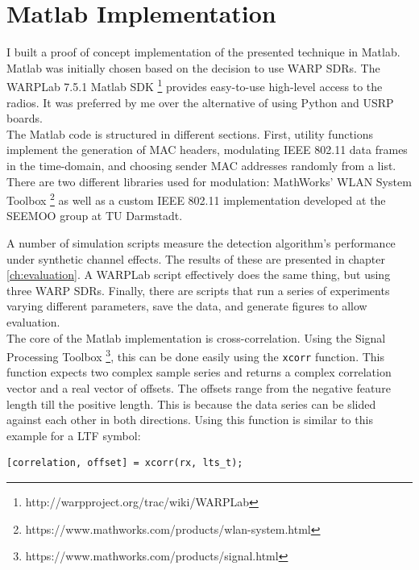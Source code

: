 
\section{Matlab Implementation}\label{sec:matlab-impl}

I built a proof of concept implementation of the presented technique in Matlab. Matlab was initially chosen based on the decision to use \gls{WARP} \glspl{SDR}. The WARPLab 7.5.1 Matlab \gls{SDK} \footnote{http://warpproject.org/trac/wiki/WARPLab} provides easy-to-use high-level access to the radios. It was preferred by me over the alternative of using Python and \gls{USRP} boards.\\

The Matlab code is structured in different sections. First, utility functions implement the generation of \gls{MAC} headers, modulating IEEE 802.11 data frames in the time-domain, and choosing sender \gls{MAC} addresses randomly from a list. There are two different libraries used for modulation: MathWorks' WLAN System Toolbox \footnote{https://www.mathworks.com/products/wlan-system.html} as well as a custom IEEE 802.11 implementation developed at the \gls{SEEMOO} group at TU Darmstadt.

A number of simulation scripts measure the detection algorithm's performance under synthetic channel effects. The results of these are presented in chapter \ref{ch:evaluation}. A WARPLab script effectively does the same thing, but using three \gls{WARP} \glspl{SDR}. Finally, there are scripts that run a series of experiments varying different parameters, save the data, and generate figures to allow evaluation.\\

The core of the Matlab implementation is cross-correlation. Using the Signal Processing Toolbox \footnote{https://www.mathworks.com/products/signal.html}, this can be done easily using the \texttt{xcorr} function. This function expects two complex sample series and returns a complex correlation vector and a real vector of offsets. The offsets range from the negative feature length till the positive length. This is because the data series can be slided against each other in both directions. Using this function is similar to this example for a \gls{LTF} symbol:\\

\begin{lstlisting}[captionpos=b,caption={Cross-Correlation of an LTF Symbol},label=lst:xcorr]
[correlation, offset] = xcorr(rx, lts_t);
\end{lstlisting}

